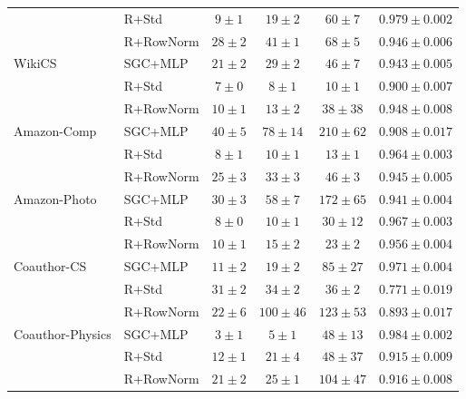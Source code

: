 \documentclass[11pt]{article}
\begin{document}
\begin{table}[H]
\begin{tabular}{llcccc}
           & R+Std        & $9\pm1$   & $19\pm2$  & $60\pm7$   & $0.979\pm0.002$ \\
           & R+RowNorm    & $28\pm2$  & $41\pm1$  & $68\pm5$   & $0.946\pm0.006$ \\
\midrule
WikiCS & SGC+MLP          & $21\pm2$  & $29\pm2$  & $46\pm7$   & $0.943\pm0.005$ \\
       & R+Std            & $7\pm0$   & $8\pm1$   & $10\pm1$   & $0.900\pm0.007$ \\
       & R+RowNorm        & $10\pm1$  & $13\pm2$  & $38\pm38$  & $0.948\pm0.008$ \\
\midrule
Amazon-Comp & SGC+MLP     & $40\pm5$  & $78\pm14$ & $210\pm62$ & $0.908\pm0.017$ \\
            & R+Std       & $8\pm1$   & $10\pm1$  & $13\pm1$   & $0.964\pm0.003$ \\
            & R+RowNorm   & $25\pm3$  & $33\pm3$  & $46\pm3$   & $0.945\pm0.005$ \\
\midrule
Amazon-Photo & SGC+MLP    & $30\pm3$  & $58\pm7$  & $172\pm65$ & $0.941\pm0.004$ \\
             & R+Std      & $8\pm0$   & $10\pm1$  & $30\pm12$  & $0.967\pm0.003$ \\
             & R+RowNorm  & $10\pm1$  & $15\pm2$  & $23\pm2$   & $0.956\pm0.004$ \\
\midrule
Coauthor-CS & SGC+MLP     & $11\pm2$  & $19\pm2$  & $85\pm27$  & $0.971\pm0.004$ \\
            & R+Std       & $31\pm2$  & $34\pm2$  & $36\pm2$   & $0.771\pm0.019$ \\
            & R+RowNorm   & $22\pm6$  & $100\pm46$& $123\pm53$ & $0.893\pm0.017$ \\
\midrule
Coauthor-Physics & SGC+MLP& $3\pm1$   & $5\pm1$   & $48\pm13$  & $0.984\pm0.002$ \\
                 & R+Std  & $12\pm1$  & $21\pm4$  & $48\pm37$  & $0.915\pm0.009$ \\
                 & R+RowNorm & $21\pm2$& $25\pm1$  & $104\pm47$ & $0.916\pm0.008$ \\
\bottomrule
\end{tabular}
\end{table}
\end{document}
